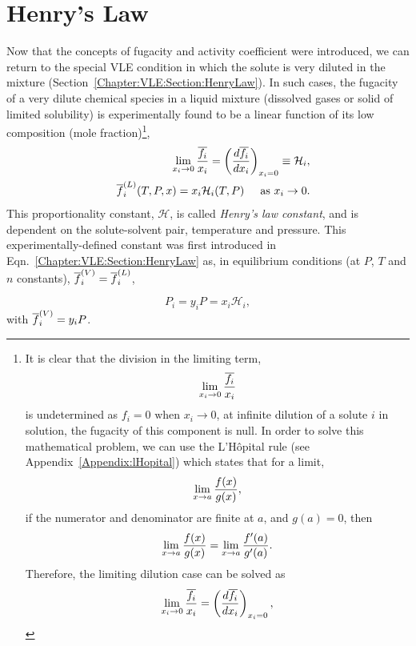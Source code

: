\section{Henry's Law}\label{Chapter:SolutionThermodynamics:Section:HenryLaw}
Now that the concepts of fugacity and activity coefficient were introduced, we can return to the special VLE condition in which the solute is very diluted in the mixture (Section~\ref{Chapter:VLE:Section:HenryLaw}). In such cases, the fugacity of a very dilute chemical species in a liquid mixture (\eg dissolved gases or solid of limited solubility) is experimentally found to be a linear function of its low composition (\ie mole fraction)\footnote{It is clear that the division in the limiting term,
  \begin{displaymath}
    \lim\limits_{x_{i}\rightarrow 0}\frc{\overline{f_{i}}}{x_{i}}
  \end{displaymath}
  is undetermined as $f_{i}=0\text{ when }x_{i}\rightarrow 0$, \ie at infinite dilution of a solute $i$ in solution, the fugacity of this component is null. In order to solve this mathematical problem, we can use the L'H\^opital rule (see Appendix~\ref{Appendix:lHopital}) which states that for a limit,
         \begin{displaymath}
                 \lim\limits_{x\rightarrow a}\frc{f(x)}{g(x)},
         \end{displaymath}
         if the numerator and denominator are finite at $a$, and $g(a)=0$, then
         \begin{displaymath}
                 \lim\limits_{x\rightarrow a}\frc{f(x)}{g(x)} =  \lim\limits_{x\rightarrow a}\frc{f'(a)}{g'(a)}.
         \end{displaymath}
         Therefore, the limiting dilution case can be solved as
         \begin{displaymath}
                 \lim\limits_{x_{i}\rightarrow 0}\frc{\overline{f_{i}}}{x_{i}} = \left(\frc{d \overline{f_{i}}}{d x_{i}}\right)_{x_{i}=0},
         \end{displaymath}
}, \ie   
      \begin{eqnarray}
        && \lim\limits_{x_{i}\rightarrow 0}\frc{\overline{f_{i}}}{x_{i}} = \left(\frc{d \overline{f_{i}}}{d x_{i}}\right)_{x_{i}=0}  \equiv \mathcal{H}_{i}, \nonumber \\
        && \mfr[\overline{f}]{i}{L}(T,P,x) = x_{i}\mathcal{H}_{i}(T,P)\;\;\;\;\text{ as } x_{i}\rightarrow 0.
      \end{eqnarray}      
This proportionality constant, $\mathcal{H}$, is called {\it Henry's law constant}, and is dependent on the solute-solvent pair, temperature and pressure. This experimentally-defined constant was first introduced in Eqn.~\ref{Chapter:VLE:Section:HenryLaw} as, in equilibrium conditions (at $P$, $T$ and $n$ constants), $\mfr[\overline{f}]{i}{V}=\mfr[\overline{f}]{i}{L}$,
         \begin{shaded}
           \begin{displaymath}
             P_{i} = y_{i}P = x_{i}\mathcal{H}_{i},
           \end{displaymath}
           with $\mfr[\overline{f}]{i}{V}=y_{i}P$.
        \end{shaded}
%

